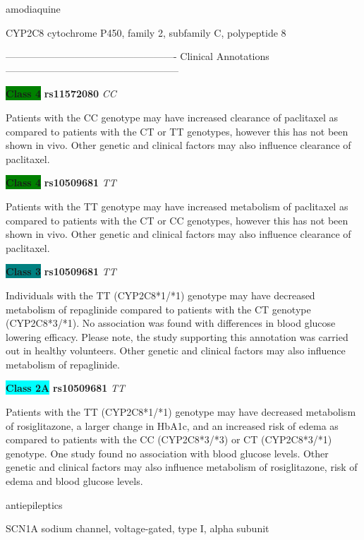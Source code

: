 \documentclass{resume} %
\begin{document}
\begin{rSection}{ amodiaquine }
\begin{rSubsection}{ CYP2C8 }{ cytochrome P450, family 2, subfamily C, polypeptide 8 }{}{}
\item[] ---------------------------------------------------- Clinical Annotations -----------------------------------------------------\newline
\item \textbf{\colorbox{green} {Class 4}} \textbf{ rs11572080 } \textit{ CC }
\item[] Patients with the CC genotype may have increased clearance of paclitaxel as compared to patients with the CT or TT genotypes, however this has not been shown in vivo. Other genetic and clinical factors may also influence clearance of paclitaxel.\item \textbf{\colorbox{green} {Class 4}} \textbf{ rs10509681 } \textit{ TT }
\item[] Patients with the TT genotype may have increased metabolism of paclitaxel as compared to patients with the CT or CC genotypes, however this has not been shown in vivo. Other genetic and clinical factors may also influence clearance of paclitaxel.\item \textbf{\colorbox{teal} {Class 3}} \textbf{ rs10509681 } \textit{ TT }
\item[] Individuals with the TT (CYP2C8*1/*1) genotype may have decreased metabolism of repaglinide compared to patients with the CT genotype (CYP2C8*3/*1). No association was found with differences in blood glucose lowering efficacy. Please note, the study supporting this annotation was carried out in healthy volunteers. Other genetic and clinical factors may also influence metabolism of repaglinide.\item \textbf{\colorbox{cyan} {Class 2A}} \textbf{ rs10509681 } \textit{ TT }
\item[] Patients with the TT (CYP2C8*1/*1) genotype may have decreased metabolism of rosiglitazone, a larger change in HbA1c, and an increased risk of edema as compared to patients with the CC (CYP2C8*3/*3) or CT (CYP2C8*3/*1) genotype. One study found no association with blood glucose levels. Other genetic and clinical factors may also influence metabolism of rosiglitazone, risk of edema and blood glucose levels.
\end{rSubsection}

\end{rSection}\begin{rSection}{ antiepileptics }
\item[]

\begin{rSubsection}{ SCN1A }{ sodium channel, voltage-gated, type I, alpha subunit }{}{}
\item[]


\end{rSubsection}
\end{rSection}
\end{document}
